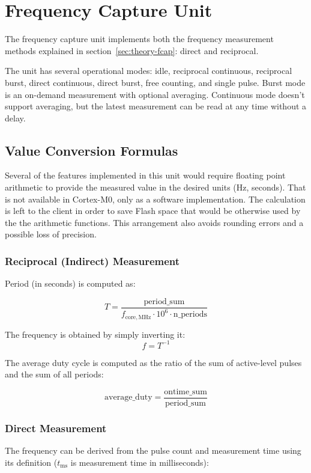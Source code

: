 
\section{Frequency Capture Unit}

The frequency capture unit implements both the frequency measurement methods explained in section~\ref{sec:theory-fcap}: direct and reciprocal.

The unit has several operational modes: idle, reciprocal continuous, reciprocal burst, direct continuous, direct burst, free counting, and single pulse. Burst mode is an on-demand measurement with optional averaging. Continuous mode doesn't support averaging, but the latest measurement can be read at any time without a delay.

\subsection{Value Conversion Formulas}

Several of the features implemented in this unit would require floating point arithmetic to provide the measured value in the desired units (Hz, seconds). That is not available in Cortex-M0, only as a software implementation. The calculation is left to the client in order to save Flash space that would be otherwise used by the the arithmetic functions. This arrangement also avoids rounding errors and a possible loss of precision.

\subsubsection{Reciprocal (Indirect) Measurement}

Period (in seconds) is computed as:

\[
	T = \dfrac{\mathrm{period\_sum}}{f_\mathrm{core,MHz} \cdot 10^6 \cdot \mathrm{n\_periods}}
\]

\noindent
The frequency is obtained by simply inverting it: \[f=T^{-1}\]

The average duty cycle is computed as the ratio of the sum of active-level pulses and the sum of all periods:

\[\mathrm{average\_duty} = \dfrac{\mathrm{ontime\_sum}}{\mathrm{period\_sum}}\]

\subsubsection{Direct Measurement}

The frequency can be derived from the pulse count and measurement time using its definition ($t_\mathrm{ms}$ is measurement time in milliseconds):

